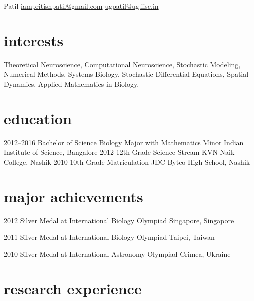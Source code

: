 \documentclass[11pt,print]{friggeri-cv}%
\begin{document}
 {Patil} 
        {\href{mailto:iampritishpatil@gmail.com}{iampritishpatil@gmail.com}\quad  
    \href{mailto:ugpatil@ug.iisc.in}{ugpatil@ug.iisc.in}
}



\section{interests}

Theoretical Neuroscience, Computational Neuroscience, Stochastic Modeling, Numerical Methods, Systems Biology, Stochastic Differential Equations, Spatial Dynamics, Applied Mathematics in Biology.




\section{education}

\begin{entrylist}
  \entryyy
    {2012--2016}
    {Bachelor of Science {\normalfont Biology Major with Mathematics Minor }  }
    {Indian Institute of Science, Bangalore}
  \entryyy
    {2012}
    {12th Grade {\normalfont Science Stream} }
  {KVN Naik College, Nashik}
  \entryyy
    {2010}
    {10th Grade     {\normalfont Matriculation}}
    {JDC Bytco High School, Nashik}
\end{entrylist}


\section{major achievements}
\begin{entrylist}
  \entryyy
    {2012}
    { {\normalfont Silver Medal at }International Biology Olympiad     }
    {Singapore, Singapore}
    
  \entryyy
    {2011}
    {  {\normalfont Silver Medal at }International Biology Olympiad}
    {Taipei, Taiwan}
    
  \entryyy
    {2010}
    { {\normalfont Silver Medal at }International Astronomy Olympiad }
    {Crimea, Ukraine}



\end{entrylist}

\section{research experience}
\end{document}
